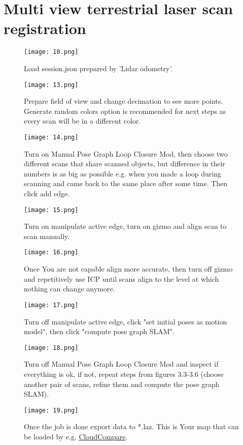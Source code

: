\chapter{Multi view terrestrial laser scan registration}

\begin{figure}
	\centering
	\texttt{[image: 10.png]}
	\caption{Load session.json prepared by 'Lidar odometry'.}
	\label{fig:10}
\end{figure}

\begin{figure}
	\centering
	\texttt{[image: 13.png]}
	\caption{Prepare field of view and change decimation to see more points. Generate random colors option is recommended for next steps as every scan will be in a different color.}
	\label{fig:13}
\end{figure}

\begin{figure}
	\centering
	\texttt{[image: 14.png]}
	\caption{Turn on Manual Pose Graph Loop Closure Mod, then choose two different scans that share scanned objects, but difference in their numbers is as big as possible e.g. when you made a loop during scanning and came back to the same place after some time. Then click add edge.} 
	\label{fig:14}
\end{figure}

\begin{figure}
	\centering
	\texttt{[image: 15.png]}
	\caption{Turn on manipulate active edge, turn on gizmo and align scan to scan manually.}
	\label{fig:15}
\end{figure}

\begin{figure}
	\centering
	\texttt{[image: 16.png]}
	\caption{Once You are not capable align more accurate, then turn off gizmo and repetitively use ICP until scans align to the level at which nothing can change anymore.}
	\label{fig:16}
\end{figure}

\begin{figure}
	\centering
	\texttt{[image: 17.png]}
	\caption{Turn off manipulate active edge, click "set initial poses as motion model", then click "compute pose graph SLAM".}
	\label{fig:17}
\end{figure}

\begin{figure}
	\centering
	\texttt{[image: 18.png]}
	\caption{Turn off Manual Pose Graph Loop Closure Mod and inspect if everything is ok, if not,  repeat steps from figures 3.3-3.6 (choose another pair of scans, refine them and compute the pose graph SLAM).}
	\label{fig:18}
\end{figure}

\begin{figure}
	\centering
	\texttt{[image: 19.png]}
	\caption{Once the job is done export data to *.laz. This is Your map that can be loaded by e.g. \href{https://www.cloudcompare.org/}{CloudCompare}.}
	\label{fig:19}
\end{figure}